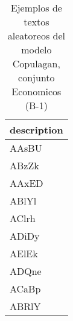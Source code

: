 \begin{table}[H]
\centering
\fontsize{8}{14}\selectfont
\caption{Ejemplos de textos aleatoreos del modelo Copulagan, conjunto Economicos (B-1)}
\label{table-sample10-economicos-b-1-copulagan-text}
\begin{tabular}{|m{50em}|}
\hline
\rowcolor[gray]{0.8}
description \\
\hline AAsBU \\
\hline ABzZk \\
\hline AAxED \\
\hline ABlYl \\
\hline AClrh \\
\hline ADiDy \\
\hline AElEk \\
\hline ADQne \\
\hline ACaBp \\
\hline ABRlY \\
\hline
\end{tabular}
\end{table}
